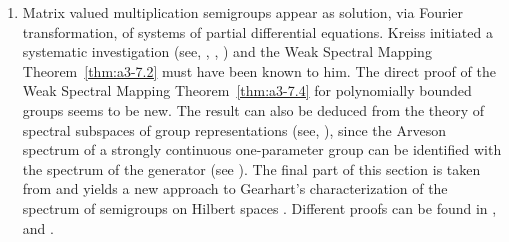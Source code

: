 \begin{enumerate}[%
,label={\Large\emph{Section \arabic*:}}
, wide
, labelindent=0.0em
]
\item 
Matrix valued multiplication semigroups appear as solution, via Fourier transformation, of systems of partial differential equations.
Kreiss initiated a systematic investigation (see, \eg \citet{kreiss:1958}, \citet{kreiss:1959}, \citet{millerstrang:1966}) and the Weak Spectral Mapping Theorem~\ref{thm:a3-7.2} must have been known to him. The direct proof of the Weak Spectral Mapping Theorem~\ref{thm:a3-7.4} for polynomially bounded groups seems to be new. The result can also be deduced from the theory of spectral subspaces of group representations (see, \eg \citet{combesdelaroche:1978}), since the Arveson spectrum of a strongly continuous one-parameter group can be identified with the spectrum of the generator (see \citet{evans:1976}). The final part of this section is taken from \citet{greiner:1985} and yields a new approach to Gearhart's characterization of the spectrum of semigroups on Hilbert spaces \citet{gearhart:1978}. Different proofs can be found in \citet{herbst:1983}, \citet{howland:1984} and \citet{pruess:1984}. 
\end{enumerate}

\RaggedRight

 

